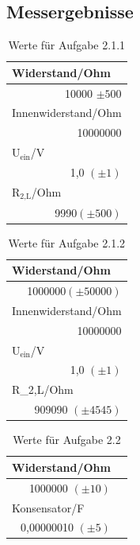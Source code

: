 \documentclass[12pt]{scrartcl}
\begin{document}
\subsection{Messergebnisse}
\begin{table}[H]
\caption{Werte für Aufgabe 2.1.1}
\begin{center}
\begin{tabular}{|l|}
\hline
Widerstand/Ohm \\ \hline
\multicolumn{1}{|r|}{10000 $\pm 500$} \\ \hline
Innenwiderstand/Ohm \\ \hline
\multicolumn{1}{|r|}{10000000} \\ \hline
U$_\text{ein}$/V  \\ \hline
\multicolumn{1}{|r|}{1,0 $(\pm 1)$} \\ \hline
R$_\text{2,L}$/Ohm \\ \hline
\multicolumn{1}{|r|}{9990$(\pm 500)$} \\ \hline
\end{tabular}
\end{center}
\label{tab:2.2.1}
\end{table}

\begin{table}[H]
\caption{Werte für Aufgabe 2.1.2}
\begin{center}
\begin{tabular}{|l|}
\hline
Widerstand/Ohm \\ \hline
\multicolumn{1}{|r|}{1000000$(\pm 50000)$} \\ \hline
Innenwiderstand/Ohm  \\ \hline
\multicolumn{1}{|r|}{10000000} \\ \hline
U$_\text{ein}$/V  \\ \hline
\multicolumn{1}{|r|}{1,0 $(\pm 1)$}  \\ \hline
R\_2,L/Ohm \\ \hline
\multicolumn{1}{|r|}{909090 $(\pm 4545)$} \\ \hline
\end{tabular}
\end{center}
\label{tab:2.1.2}
\end{table}

\begin{table}[H]
\caption{Werte für Aufgabe 2.2}
\begin{center}
\begin{tabular}{|l|l|}
\hline
Widerstand/Ohm  \\ \hline
\multicolumn{1}{|r|}{1000000 $(\pm 10)$} \\ \hline
Konsensator/F \\ \hline
\multicolumn{1}{|r|}{0,00000010 $(\pm 5)$}\\ \hline
\end{tabular}
\end{center}
\label{tab:2.2}
\end{table}
\end{document}
